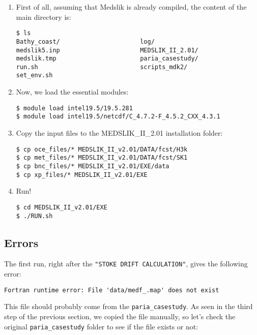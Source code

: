 \begin{enumerate}
    \item First of all, assuming that Medslik is already compiled, the content of the main directory is:

\begin{lstlisting}
$ ls
Bathy_coast/                      log/
medslik5.inp                      MEDSLIK_II_2.01/
medslik.tmp                       paria_casestudy/
run.sh                            scripts_mdk2/
set_env.sh
\end{lstlisting}

\item Now, we load the essential modules:

\begin{lstlisting}
$ module load intel19.5/19.5.281
$ module load intel19.5/netcdf/C_4.7.2-F_4.5.2_CXX_4.3.1
\end{lstlisting}

\item Copy the input files to the MEDSLIK\_II\_2.01 installation folder:

\begin{lstlisting}
$ cp oce_files/* MEDSLIK_II_v2.01/DATA/fcst/H3k    
$ cp met_files/* MEDSLIK_II_v2.01/DATA/fcst/SK1    
$ cp bnc_files/* MEDSLIK_II_v2.01/EXE/data
$ cp xp_files/* MEDSLIK_II_v2.01/EXE
\end{lstlisting}

\item Run!

\begin{lstlisting}
$ cd MEDSLIK_II_v2.01/EXE
$ ./RUN.sh
\end{lstlisting}

\end{enumerate}

\subsection{Errors}

The first run, right after the \texttt{"STOKE DRIFT CALCULATION"}, gives the following error:

\begin{lstlisting}
Fortran runtime error: File 'data/medf_.map' does not exist
\end{lstlisting}

This file should probably come from the \texttt{paria\_casestudy}. As seen in the third step of the previous section, we copied the file manually, so let's check the original \texttt{paria\_casestudy} folder to see if the file exists or not:

